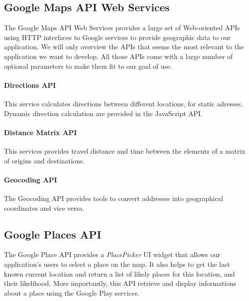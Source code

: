 \subsection{Google Maps API Web Services} The Google Maps API Web Services provides a large set of Web-oriented APIs using HTTP interfaces to Google services to provide geographic data to our application. We will only overview the APIs that seems the most relevant to the application we want to develop. All those APIs come with a large number of optional parameters to make them fit to our goal of use.
\paragraph{Directions API} This service calculates directions between different locations, for static adresses. Dynamic direction calculation are provided in the JavaScript API.

\paragraph{Distance Matrix API} This services provides travel distance and time between the elements of a matrix of origins and destinations.

\paragraph{Geocoding API} The Geocoding API provides tools to convert addresses into geographical coordinates and vice versa.

\subsection{Google Places API}The Google Place API provides a \textit{PlacePicker} UI widget that allows our application's users to select a place on the map. It also helps to get the last known current location and return a list of likely places for this location, and their likelihood. More importantly, this API retrieve and display informations about a place using the Google Play services.